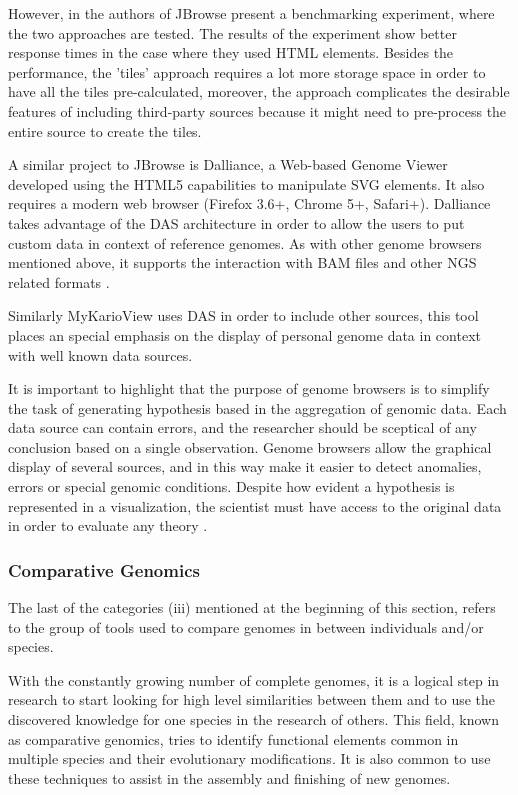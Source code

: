 However, in \cite{SKI2009} the authors of JBrowse present a benchmarking experiment, where the two approaches are tested. The results of the experiment show better response times in the case where they used HTML elements. Besides the performance, the 'tiles' approach requires a lot more storage space in order to have all the tiles pre-calculated, moreover, the approach complicates the desirable features of including third-party sources because it might need to pre-process the entire source to create the tiles.

A similar project to JBrowse is Dalliance, a Web-based Genome Viewer developed using the HTML5 capabilities to manipulate SVG elements. It also requires a modern web browser (Firefox 3.6+, Chrome 5+, Safari+). Dalliance takes advantage of the DAS architecture in order to allow the users to put custom data in context of reference genomes. As with other genome browsers mentioned above, it supports the interaction with BAM files and other NGS related formats \cite{DOW2011}. 

Similarly MyKarioView uses DAS in order to include other sources, this tool places an special emphasis on the display of personal genome data in context with well known data sources.

It is important to highlight that the purpose of genome browsers is to simplify the task of generating hypothesis based in the aggregation of genomic data. Each data source can contain errors, and the researcher should be sceptical of any conclusion based on a single observation. Genome browsers allow the graphical display of several sources, and in this way make it easier to detect anomalies, errors or special genomic conditions. Despite how evident a hypothesis is represented in a visualization, the scientist must have access to the original data in order to evaluate any theory \cite{CLI2009}.

\subsubsection{Comparative Genomics}
The last of the categories (iii) mentioned at the beginning of this section, refers to the group of tools used to compare genomes in between individuals and/or species.

With the constantly growing number of complete genomes, it is a logical step in research to start looking for high level similarities between them and to use the discovered knowledge for one species in the research of others. This field, known as comparative genomics, tries to identify functional elements common in multiple species and their evolutionary modifications. It is also common to use these techniques to assist in the assembly and finishing of new genomes.

